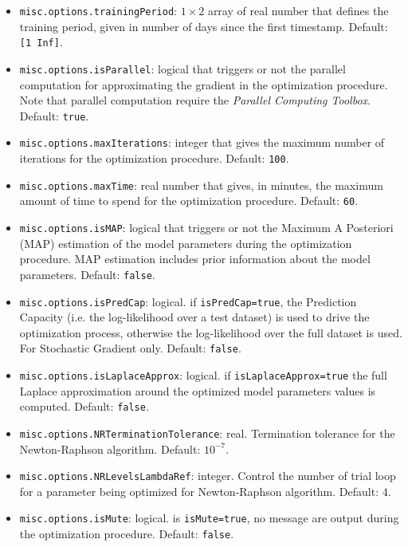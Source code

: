 \begin{itemize}
\begin{itemize}
\item \lstinline[basicstyle = \mlttfamily \small ]!misc.options.trainingPeriod!:  $1\times2$ array of real number that defines the training period, given in number of days since the first timestamp. Default: \lstinline[basicstyle = \mlttfamily \small ]![1 Inf]!. 
\item \lstinline[basicstyle = \mlttfamily \small ]!misc.options.isParallel!: logical that triggers or not the parallel computation for approximating the gradient in the optimization procedure. Note that parallel computation require the \MATLAB{} \emph{Parallel Computing Toolbox}. Default: \lstinline[basicstyle = \mlttfamily \small ]!true!.
\item \lstinline[basicstyle = \mlttfamily \small ]!misc.options.maxIterations!: integer that gives the maximum number of iterations for the optimization procedure. Default: \lstinline[basicstyle = \mlttfamily \small ]!100!.
\item \lstinline[basicstyle = \mlttfamily \small ]!misc.options.maxTime!: real number that gives, in minutes, the maximum amount of  time to spend for the optimization procedure. Default: \lstinline[basicstyle = \mlttfamily \small ]!60!.
\item \lstinline[basicstyle = \mlttfamily \small ]!misc.options.isMAP!: logical that triggers or not the Maximum A Posteriori (MAP) estimation of the model parameters during the optimization procedure. MAP estimation includes prior information about the model parameters. Default: \lstinline[basicstyle = \mlttfamily \small ]!false!.
\item \lstinline[basicstyle = \mlttfamily \small ]!misc.options.isPredCap!: logical.  if \lstinline[basicstyle = \mlttfamily \small ]!isPredCap=true!, the Prediction Capacity (i.e. the log-likelihood over a test dataset) is used to drive the optimization process, otherwise the log-likelihood over the full dataset is used. For Stochastic Gradient only. Default: \lstinline[basicstyle = \mlttfamily \small ]!false!.
\item \lstinline[basicstyle = \mlttfamily \small ]!misc.options.isLaplaceApprox!: logical. if \lstinline[basicstyle = \mlttfamily \small ]!isLaplaceApprox=true! the full Laplace approximation around the optimized model parameters values is computed. Default: \lstinline[basicstyle = \mlttfamily \small ]!false!.
\item \lstinline[basicstyle = \mlttfamily \small ]!misc.options.NRTerminationTolerance!: real. Termination tolerance for the Newton-Raphson algorithm. Default: $10^{-7}$.
\item \lstinline[basicstyle = \mlttfamily \small ]!misc.options.NRLevelsLambdaRef!: integer. Control the number of trial loop for a parameter being optimized for Newton-Raphson algorithm. Default: $4$.
\item \lstinline[basicstyle = \mlttfamily \small ]!misc.options.isMute!: logical. is \lstinline[basicstyle = \mlttfamily \small ]!isMute=true!, no message are output during the optimization procedure. Default: \lstinline[basicstyle = \mlttfamily \small ]!false!.


\end{itemize}
\end{itemize}
